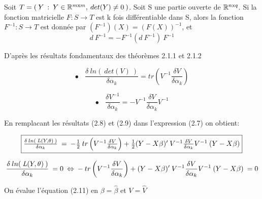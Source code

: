 \documentclass[11pt,fleqn]{book} %
\begin{document}
\vspace{1em}

\begin{theorem}
Soit $T=\left(\: Y\::\:Y\in\mathbb{R}^{m\textnormal{x}m},\:det(Y)\neq 0 \:\right)$. Soit S une partie ouverte de $\mathbb{R}^{n\textnormal{x}q}$. Si la fonction matricielle $F:S\rightarrow T$ est k fois différentiable dans S, alors la fonction $F^{-1}:S\rightarrow T$ est donnée par $(F^{-1})(X)=(F(X))^{-1}$, et 
\[ d\:F^{-1}=-F^{-1}(d\:F^{-1})\:F^{-1}\]
\end{theorem}

\vspace{1em}

D'après les résultats fondamentaux des théorèmes 2.1.1 et 2.1.2 

\begin{equation} 
\bullet \:\:\:\: \frac{ \delta \:ln(\:det(V)\:) }{\delta \alpha_k}= tr\left( V^{-1} \frac{ \delta V }{\delta \alpha_k} \right) 
\end{equation}

\begin{equation} 
\bullet \:\:\:\: \frac{ \delta V^{-1} }{\delta \alpha_k} = -V^{-1} \frac{ \delta V }{\delta \alpha_k} V^{-1}
\end{equation}

\vspace{1em}

En remplacant les résultats (2.8) et (2.9) dans l'expression (2.7) on obtient:

\begin{equation}
\fbox{$
\frac{\delta \: ln( \:\textit{L}(Y,\theta)\:) }{\delta \alpha_k} \:=\: -\frac{1}{2} \: tr\left( V^{-1} \frac{ \delta V }{\delta \alpha_k} \right)  +\frac{1}{2}  (Y-X\beta)'\:V^{-1} \frac{ \delta V }{\delta \alpha_k} V^{-1}\:(Y-X\beta) 
$}
\end{equation}

\vspace{1em}

\begin{equation}
\frac{\delta \: ln( \:\textit{L}(Y,\theta)\:) }{\delta \alpha_k} \:=0 \: \Leftrightarrow\: - \: tr\left( V^{-1} \frac{ \delta V }{\delta \alpha_k} \right)  + (Y-X\beta)'\:V^{-1} \frac{ \delta V }{\delta \alpha_k} V^{-1}\:(Y-X\beta) \:=0 \\
\end{equation}

\vspace{1em}

On évalue l'équation \:(2.11)\:\: en \:\: $\beta=\hat{\beta}$ \:\:et\:\: $V=\hat{V}$ 
\end{document}
